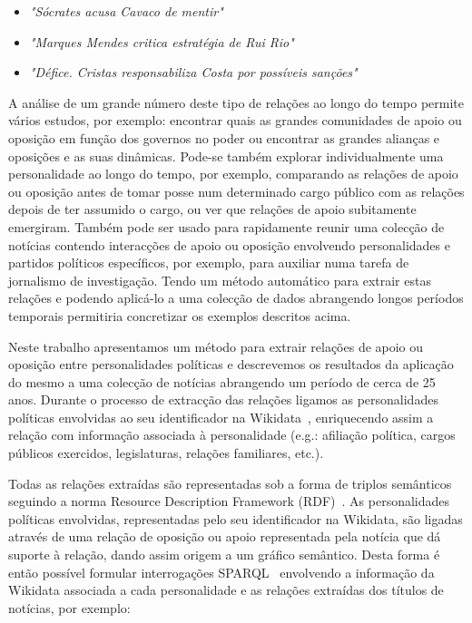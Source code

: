 \documentclass[a4paper, twocolumn, 11pt, twoside]{article}
\begin{document}
\begin{itemize}
\item{\textit{"Sócrates acusa Cavaco de mentir"}}
\item{\textit{"Marques Mendes critica estratégia de Rui Rio"}}
\item{\textit{"Défice. Cristas responsabiliza Costa por possíveis sanções"}}
\end{itemize}

A análise de um grande número deste tipo de relações ao longo do tempo permite vários estudos, por exemplo: encontrar quais as grandes comunidades de apoio ou oposição em função dos governos no poder ou encontrar as grandes alianças e oposições e as suas dinâmicas. Pode-se também explorar individualmente uma personalidade ao longo do tempo, por exemplo, comparando as relações de apoio ou oposição antes de tomar posse num determinado cargo público com as relações depois de ter assumido o cargo, ou ver que relações de apoio subitamente emergiram. Também pode ser usado para rapidamente reunir uma colecção de notícias contendo interacções de apoio ou oposição envolvendo personalidades e partidos políticos específicos, por exemplo, para auxiliar numa tarefa de jornalismo de investigação. Tendo um método automático para extrair estas relações e podendo aplicá-lo a uma colecção de dados abrangendo longos períodos temporais permitiria concretizar os exemplos descritos acima.

Neste trabalho apresentamos um método para extrair relações de apoio ou oposição entre personalidades políticas e descrevemos os resultados da aplicação do mesmo a uma colecção de notícias abrangendo um período de cerca de 25 anos. Durante o processo de extracção das relações ligamos as personalidades políticas envolvidas ao seu identificador na Wikidata~\citep{MKGGB2018}, enriquecendo assim a relação com informação associada à personalidade (e.g.: afiliação política, cargos públicos exercidos, legislaturas, relações familiares, etc.). 

Todas as relações extraídas são representadas sob a forma de triplos semânticos seguindo a norma Resource Description Framework (RDF)~\citep{schreiber2014primer}. As personalidades políticas envolvidas, representadas pelo seu identificador na Wikidata, são ligadas através de uma relação de oposição ou apoio representada pela notícia que dá suporte à relação, dando assim origem a um gráfico semântico. Desta forma é então possível formular interrogações SPARQL~\citep{2013sparql} envolvendo a informação da Wikidata associada a cada personalidade e as relações extraídas dos títulos de notícias, por exemplo:
\end{document}
